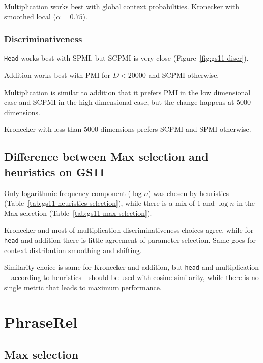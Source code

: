 Multiplication works best with global context probabilities. Kronecker with smoothed local ($\alpha = 0.75$).

\subsubsection{Discriminativeness}



\texttt{Head} works best with SPMI, but SCPMI is very close (Figure~\ref{fig:gs11-discr}).

Addition works best with PMI for $D < 20000$ and SCPMI otherwise.

Multiplication is similar to addition that it prefers PMI in the low dimensional case and SCPMI in the high dimensional case, but the change happens at 5000 dimensions.

Kronecker with less than 5000 dimensions prefers SCPMI and SPMI otherwise.


\subsection{Difference between Max selection and heuristics on GS11}

Only logarithmic frequency component ($\log n$) was chosen by heuristics (Table~\ref{tab:gs11-heuristics-selection}), while there is a mix of 1 and $\log n$ in the Max selection (Table~\ref{tab:gs11-max-selection}).

Kronecker and most of multiplication discriminativeness choices agree, while for \texttt{head} and addition there is little agreement of parameter selection. Same goes for context distribution smoothing and shifting.

Similarity choice is same for Kronecker and addition, but \texttt{head} and multiplication---according to heuristics---should be used with cosine similarity, while there is no single metric that leads to maximum performance.

\section{PhraseRel}
\label{sec:phraserel-experiment}


\subsection{Max selection}
\label{sec:max-selection-phraserel}

